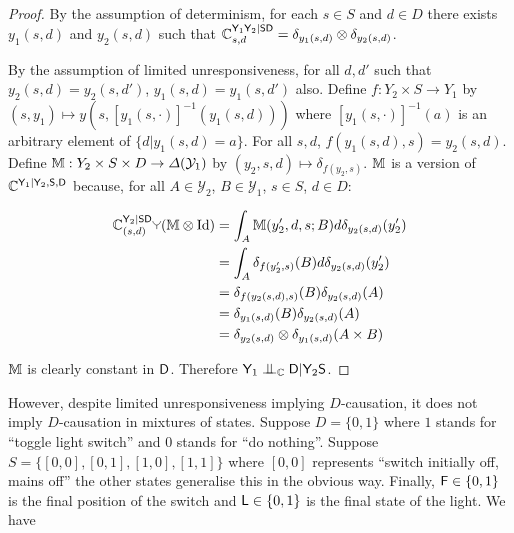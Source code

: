 \begin{proof}
By the assumption of determinism, for each $s\in S$ and $d\in D$ there exists $y_1(s,d)$ and $y_2(s,d)$ such that $\mathbb{C}^{\mathsf{Y}_1\mathsf{Y}_2|\mathsf{S}\mathsf{D}}_{s,d} = \delta_{y_1(s,d)}\otimes\delta_{y_2(s,d)}$.

By the assumption of limited unresponsiveness, for all $d,d'$ such that $y_2(s,d)=y_2(s,d')$, $y_1(s,d)=y_1(s,d')$ also. Define $f:Y_2\times S\to Y_1$ by $(s,y_1)\mapsto y(s,[y_1(s,\cdot)]^{-1}(y_1(s,d)))$ where $[y_1(s,\cdot)]^{-1}(a)$ is an arbitrary element of $\{d|y_1(s,d)=a\}$. For all $s,d$, $f(y_1(s,d),s)=y_2(s,d)$. Define $\mathbb{M}:Y_2\times S\times D\to \Delta(\mathcal{Y}_1)$ by $(y_2,s,d)\mapsto \delta_{f(y_2,s)}$. $\mathbb{M}$ is a version of $\mathbb{C}^{\mathsf{Y}_1|\mathsf{Y}_2,\mathsf{S},\mathsf{D}}$ because, for all $A\in \mathcal{Y}_2$, $B\in \mathcal{Y}_1$, $s\in S$, $d\in D$:

\begin{align}
    \kernel{C}^{\RV{Y}_2|\RV{S}\RV{D}}_{(s,d)}\splitter{0.1}(\kernel{M}\otimes\mathrm{Id}) &= \int_A \kernel{M}(y_2',d,s;B) d\delta_{y_2(s,d)}(y_2') \\
                                                                                        &= \int_A \delta_{f(y_2',s)}(B) d\delta_{y_2(s,d)}(y_2') \\
                                                                                        &= \delta_{f(y_2(s,d),s)}(B)\delta_{y_2(s,d)}(A) \\
                                                                                        &= \delta_{y_1(s,d)}(B)\delta_{y_2(s,d)}(A)\\
                                                                                        &= \delta_{y_2(s,d)}\otimes\delta_{y_1(s,d)}(A\times B)
\end{align}

$\mathbb{M}$ is clearly constant in $\mathsf{D}$. Therefore $\RV{Y}_1\CI_{\kernel{C}}\RV{D}|\RV{Y}_2\RV{S}$.
\end{proof}

However, despite limited unresponsiveness implying $D$-causation, it does not imply $D$-causation in mixtures of states. Suppose $D=\{0,1\}$ where $1$ stands for ``toggle light switch'' and $0$ stands for ``do nothing''. Suppose $S=\{[0,0],[0,1],[1,0],[1,1]\}$ where $[0,0]$ represents ``switch initially off, mains off'' the other states generalise this in the obvious way. Finally, $\mathsf{F}\in\{0,1\}$ is the final position of the switch and $\mathsf{L}\in\{0,1\}$ is the final state of the light. We have

